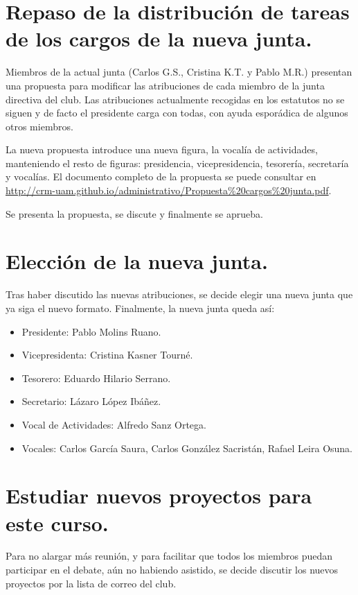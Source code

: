 \documentclass[a4paper]{article}
\begin{document}
\section{Repaso de la distribución de tareas de los cargos de la nueva junta.}

Miembros de la actual junta (Carlos G.S., Cristina K.T. y Pablo M.R.) presentan una propuesta para modificar las atribuciones de cada miembro de la junta directiva del club. Las atribuciones actualmente recogidas en los estatutos no se siguen y de facto el presidente carga con todas, con ayuda esporádica de algunos otros miembros. 

La nueva propuesta introduce una nueva figura, la vocalía de actividades, manteniendo el resto de figuras: presidencia, vicepresidencia, tesorería, secretaría y vocalías. El documento completo de la propuesta se puede consultar en \url{http://crm-uam.github.io/administrativo/Propuesta\%20cargos\%20junta.pdf}.

Se presenta la propuesta, se discute y finalmente se aprueba.

\section{Elección de la nueva junta.}

Tras haber discutido las nuevas atribuciones, se decide elegir una nueva junta que ya siga el nuevo formato. Finalmente, la nueva junta queda así:

\begin{itemize}
\item Presidente: Pablo Molins Ruano.
\item Vicepresidenta: Cristina Kasner Tourné.
\item Tesorero: Eduardo Hilario Serrano.
\item Secretario: Lázaro López Ibáñez.
\item Vocal de Actividades: Alfredo Sanz Ortega.
\item Vocales: Carlos García Saura, Carlos González Sacristán, Rafael Leira Osuna.
\end{itemize}

\section{Estudiar nuevos proyectos para este curso.}

Para no alargar más reunión, y para facilitar que todos los miembros puedan participar en el debate, aún no habiendo asistido, se decide discutir los nuevos proyectos por la lista de correo del club.
\end{document}
